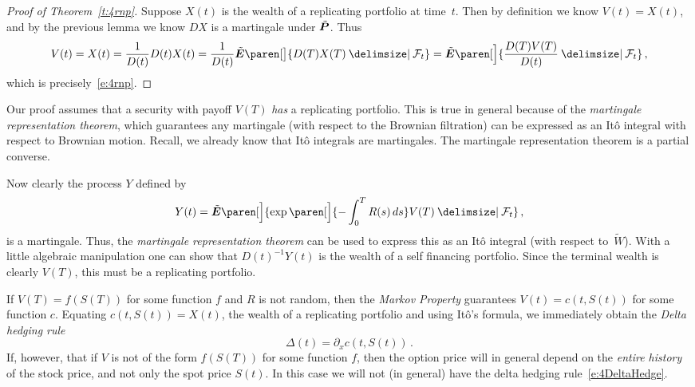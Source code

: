 \begin{proof}[Proof of Theorem~\ref{t:4rnp}]
  Suppose $X(t)$ is the wealth of a replicating portfolio at time~$t$.
  Then by definition we know $V(t) = X(t)$, and by the previous lemma we know $DX$ is a martingale under $\tilde\P$.
  Thus
  \begin{equation*}
    V(t)
      = X(t)
      = \frac{1}{D(t)} D(t) X(t)
      = \frac{1}{D(t)} \tilde\E\paren[\big]{ D(T) X(T) \given \mathcal F_t }
      = \tilde\E\paren[\Big]{
	  \frac{D(T) V(T)}{D(t)} \given \mathcal F_t }\,,
  \end{equation*}
  which is precisely~\eqref{e:4rnp}.
\end{proof}
\begin{remark}
  Our proof assumes that a security with payoff $V(T)$ \emph{has} a replicating portfolio.
  This is true in general because of the \emph{martingale representation theorem}, which guarantees any martingale (with respect to the Brownian filtration) can be expressed as an It\^o integral with respect to Brownian motion.
  Recall, we already know that It\^o integrals are martingales.
  The martingale representation theorem is a partial converse.

  Now clearly the process $Y$ defined by
  \begin{equation*}
    Y(t) = \tilde\E \paren[\Big]{\exp\paren[\Big]{-\int_0^T R(s) \, ds} V(T) \given \mathcal F_t }\,,
  \end{equation*}
  is a martingale.
  Thus, the \emph{martingale representation theorem} can be used to express this as an It\^o integral (with respect to~$\tilde W$).
  With a little algebraic manipulation one can show that $D(t)^{-1} Y(t)$ is the wealth of a self financing portfolio.
  Since the terminal wealth is clearly $V(T)$, this must be a replicating portfolio.
\end{remark}
\begin{remark}
  If $V(T) = f(S(T))$ for some function $f$ and $R$ is not random, then the \emph{Markov Property} guarantees $V(t) = c(t, S(t))$ for some function $c$.
  Equating $c(t, S(t)) = X(t)$, the wealth of a replicating portfolio and using It\^o's formula, we immediately obtain the \emph{Delta hedging rule}
  \begin{equation}\label{e:4DeltaHedge}
    \Delta(t) = \partial_x c(t, S(t))\,.
  \end{equation}
  If, however, that if $V$ is not of the form $f(S(T))$ for some function $f$, then the option price will in general depend on the \emph{entire history} of the stock price, and not only the spot price $S(t)$.
  In this case we will not (in general) have the delta hedging rule~\eqref{e:4DeltaHedge}.
\end{remark}

